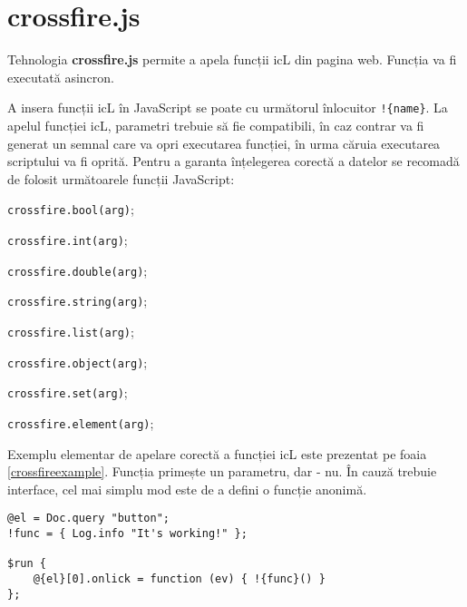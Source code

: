 \section{crossfire.js}

Tehnologia {\bf crossfire.js} permite a apela funcții icL din pagina web. Funcția va fi executată asincron.

A insera funcții icL în JavaScript se poate cu următorul înlocuitor \lstinline|!{name}|. La apelul funcției icL, parametri trebuie să fie compatibili, în caz contrar va fi generat un semnal care va opri executarea funcției, în urma căruia executarea scriptului va fi oprită. Pentru a garanta înțelegerea corectă a datelor se recomadă de folosit următoarele funcții JavaScript:
\begin{icItems}
	\item \lstinline|crossfire.bool(arg)|;
	\item \lstinline|crossfire.int(arg)|;
	\item \lstinline|crossfire.double(arg)|;
	\item \lstinline|crossfire.string(arg)|;
	\item \lstinline|crossfire.list(arg)|;
	\item \lstinline|crossfire.object(arg)|;
	\item \lstinline|crossfire.set(arg)|;
	\item \lstinline|crossfire.element(arg)|;
\end{icItems}

Exemplu elementar de apelare corectă a funcției icL este prezentat pe foaia \ref{crossfireexample}. Funcția  primește un parametru, dar  - nu. În cauză trebuie interface, cel mai simplu mod este de a defini o funcție anonimă.

\begin{lstlisting}[caption=Exemplu de apelare a funcției icL, label=crossfireexample]
@el = Doc.query "button";
!func = { Log.info "It's working!" };

$run {
	@{el}[0].onlick = function (ev) { !{func}() }
};
\end{lstlisting}

